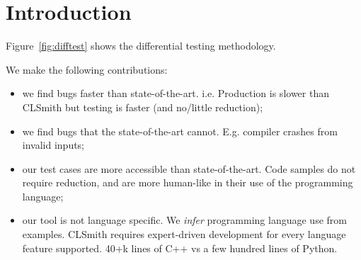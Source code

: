 \section{Introduction}\label{sec:intro}

Figure~\ref{fig:difftest} shows the differential testing methodology.

We make the following contributions:
%
\begin{itemize}
\item we find bugs faster than state-of-the-art. i.e. Production is slower than CLSmith but testing is faster (and no/little reduction);
\item we find bugs that the state-of-the-art cannot. E.g. compiler crashes from invalid inputs;
\item our test cases are more accessible than state-of-the-art. Code samples do not require reduction, and are more human-like in their use of the programming language;
\item our tool is not language specific. We \emph{infer} programming language use from examples. CLSmith requires expert-driven development for every language feature supported. 40+k lines of C++ vs a few hundred lines of Python.
\end{itemize}
